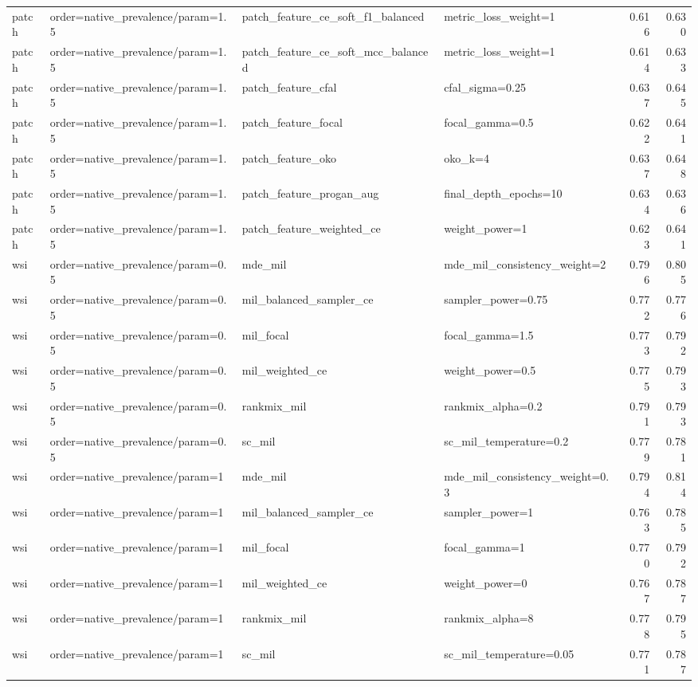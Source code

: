 \begin{tabular}{llllrr}
patch & order=native_prevalence/param=1.5 & patch_feature_ce_soft_f1_balanced & metric_loss_weight=1 & 0.616 & 0.630\\
patch & order=native_prevalence/param=1.5 & patch_feature_ce_soft_mcc_balanced & metric_loss_weight=1 & 0.614 & 0.633\\
patch & order=native_prevalence/param=1.5 & patch_feature_cfal & cfal_sigma=0.25 & 0.637 & 0.645\\
patch & order=native_prevalence/param=1.5 & patch_feature_focal & focal_gamma=0.5 & 0.622 & 0.641\\
patch & order=native_prevalence/param=1.5 & patch_feature_oko & oko_k=4 & 0.637 & 0.648\\
patch & order=native_prevalence/param=1.5 & patch_feature_progan_aug & final_depth_epochs=10 & 0.634 & 0.636\\
patch & order=native_prevalence/param=1.5 & patch_feature_weighted_ce & weight_power=1 & 0.623 & 0.641\\
wsi & order=native_prevalence/param=0.5 & mde_mil & mde_mil_consistency_weight=2 & 0.796 & 0.805\\
wsi & order=native_prevalence/param=0.5 & mil_balanced_sampler_ce & sampler_power=0.75 & 0.772 & 0.776\\
wsi & order=native_prevalence/param=0.5 & mil_focal & focal_gamma=1.5 & 0.773 & 0.792\\
wsi & order=native_prevalence/param=0.5 & mil_weighted_ce & weight_power=0.5 & 0.775 & 0.793\\
wsi & order=native_prevalence/param=0.5 & rankmix_mil & rankmix_alpha=0.2 & 0.791 & 0.793\\
wsi & order=native_prevalence/param=0.5 & sc_mil & sc_mil_temperature=0.2 & 0.779 & 0.781\\
wsi & order=native_prevalence/param=1 & mde_mil & mde_mil_consistency_weight=0.3 & 0.794 & 0.814\\
wsi & order=native_prevalence/param=1 & mil_balanced_sampler_ce & sampler_power=1 & 0.763 & 0.785\\
wsi & order=native_prevalence/param=1 & mil_focal & focal_gamma=1 & 0.770 & 0.792\\
wsi & order=native_prevalence/param=1 & mil_weighted_ce & weight_power=0 & 0.767 & 0.787\\
wsi & order=native_prevalence/param=1 & rankmix_mil & rankmix_alpha=8 & 0.778 & 0.795\\
wsi & order=native_prevalence/param=1 & sc_mil & sc_mil_temperature=0.05 & 0.771 & 0.787\\

\end{tabular}
